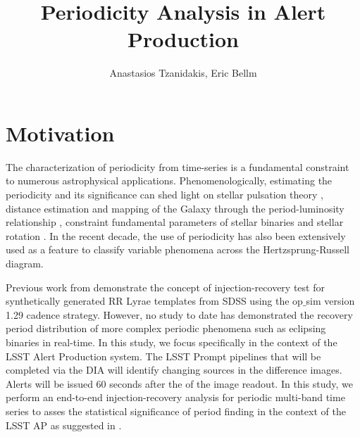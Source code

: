\documentclass[DM,authoryear,toc]{lsstdoc}
\title{Periodicity Analysis in Alert Production}
\author{%
Anastasios Tzanidakis, Eric Bellm
}
\date{\vcsDate}
\begin{document}
\maketitle



\section{Motivation}
The characterization of periodicity from time-series is a fundamental constraint to numerous astrophysical applications.
Phenomenologically, estimating the periodicity and its significance can shed light on stellar pulsation theory \citep{Antonello:Antonello81}, distance estimation and mapping of the Galaxy through the period-luminosity relationship \citep{Skowron:Skowron2019}, constraint fundamental parameters of stellar binaries \citep{Farinella:Farinella1979} and stellar rotation \citep{Walkowicz:Walkowicz13}. In the recent decade, the use of periodicity has also been extensively used as a feature to classify variable phenomena \citep{Richards:R13} across the Hertzsprung-Russell diagram.

Previous work from \cite{2012AJ....144....9O} demonstrate the concept of injection-recovery test for synthetically generated RR Lyrae templates from SDSS using the op$\_$sim version 1.29 cadence strategy. However, no study to date has demonstrated the recovery period distribution of more complex periodic phenomena such as eclipsing binaries in real-time. In this study, we focus specifically in the context of the LSST Alert Production system. The LSST Prompt pipelines that will be completed via the DIA will identify changing sources in the difference images. Alerts will be issued 60 seconds after the of the image readout. In this study, we perform an end-to-end injection-recovery analysis for periodic multi-band time series to asses the statistical significance of period finding in the context of the LSST AP as suggested in .
\end{document}
